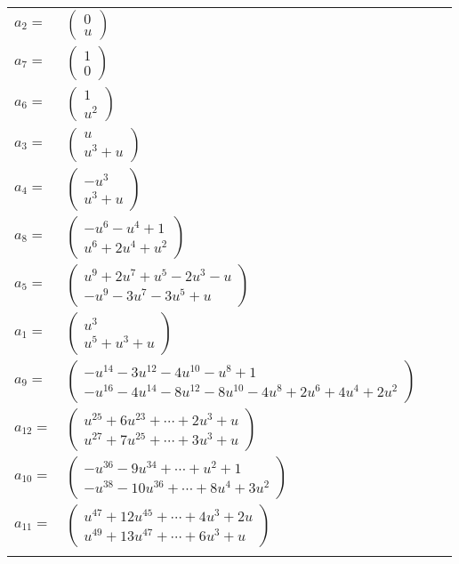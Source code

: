 \documentclass[1p]{elsarticle_modified}
\theoremstyle{definition}
\begin{document}
\begin{tabular}{m{7pt} m{180pt} m{7pt} m{180pt} }
\flushright $a_{2}=$&$\begin{pmatrix}0\\u\end{pmatrix}$ \\
\flushright $a_{7}=$&$\begin{pmatrix}1\\0\end{pmatrix}$ \\
\flushright $a_{6}=$&$\begin{pmatrix}1\\u^2\end{pmatrix}$ \\
\flushright $a_{3}=$&$\begin{pmatrix}u\\u^3+u\end{pmatrix}$ \\
\flushright $a_{4}=$&$\begin{pmatrix}- u^3\\u^3+u\end{pmatrix}$ \\
\flushright $a_{8}=$&$\begin{pmatrix}- u^6- u^4+1\\u^6+2 u^4+u^2\end{pmatrix}$ \\
\flushright $a_{5}=$&$\begin{pmatrix}u^9+2 u^7+u^5-2 u^3- u\\- u^9-3 u^7-3 u^5+u\end{pmatrix}$ \\
\flushright $a_{1}=$&$\begin{pmatrix}u^3\\u^5+u^3+u\end{pmatrix}$ \\
\flushright $a_{9}=$&$\begin{pmatrix}- u^{14}-3 u^{12}-4 u^{10}- u^8+1\\- u^{16}-4 u^{14}-8 u^{12}-8 u^{10}-4 u^8+2 u^6+4 u^4+2 u^2\end{pmatrix}$ \\
\flushright $a_{12}=$&$\begin{pmatrix}u^{25}+6 u^{23}+\cdots+2 u^3+u\\u^{27}+7 u^{25}+\cdots+3 u^3+u\end{pmatrix}$ \\
\flushright $a_{10}=$&$\begin{pmatrix}- u^{36}-9 u^{34}+\cdots+u^2+1\\- u^{38}-10 u^{36}+\cdots+8 u^4+3 u^2\end{pmatrix}$ \\
\flushright $a_{11}=$&$\begin{pmatrix}u^{47}+12 u^{45}+\cdots+4 u^3+2 u\\u^{49}+13 u^{47}+\cdots+6 u^3+u\end{pmatrix}$\\&\end{tabular}
\end{document}
